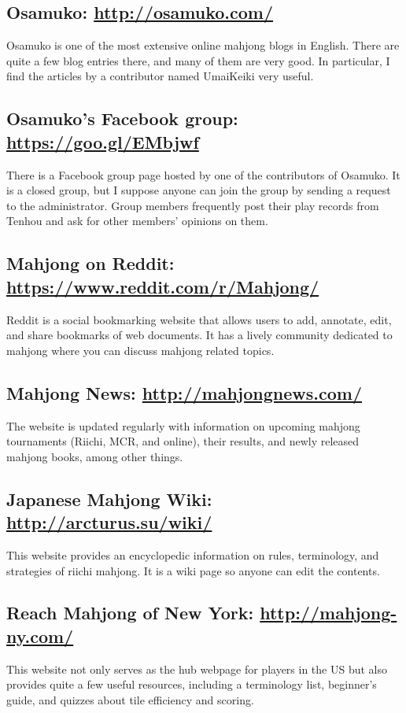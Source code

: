 \subsection*{Osamuko: \url{http://osamuko.com/}} 
Osamuko is one of the most extensive online mahjong blogs in English. There are quite a few blog entries there, and many of them are very good. In particular, I find the articles by a contributor named UmaiKeiki very useful. 

\subsection*{Osamuko's Facebook group: \url{https://goo.gl/EMbjwf}}
There is a Facebook group page hosted by one of the contributors of Osamuko. It is a closed group, but I suppose anyone can join the group by sending a request to the administrator. Group members frequently post their play records from {\jap Tenhou} and ask for other members' opinions on them. 

\subsection*{Mahjong on Reddit: \url{https://www.reddit.com/r/Mahjong/}}
Reddit is a social bookmarking website that allows users to add, annotate, edit, and share bookmarks of web documents. It has a lively community dedicated to mahjong where you can discuss mahjong related topics. 

\subsection*{Mahjong News: \url{http://mahjongnews.com/}}
The website is updated regularly with information on upcoming mahjong tournaments (Riichi, MCR, and online), their results, and newly released mahjong books, among other things. 

\subsection*{Japanese Mahjong Wiki: \url{http://arcturus.su/wiki/}}
This website provides an encyclopedic information on rules, terminology, and strategies of riichi mahjong. It is a wiki page so anyone can edit the contents. 

\subsection*{Reach Mahjong of New York: \url{http://mahjong-ny.com/}}
This website not only serves as the hub webpage for players in the US but also provides quite a few useful resources, including a terminology list, beginner's guide, and quizzes about tile efficiency and scoring.

